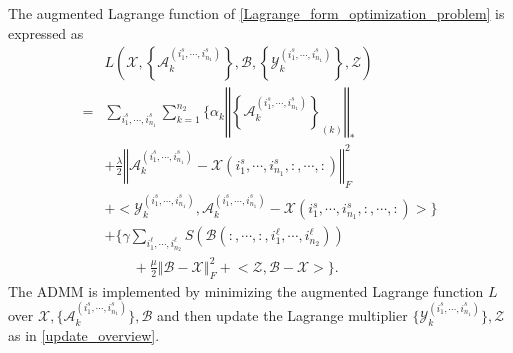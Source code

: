 \documentclass[12pt, draftcls, onecolumn]{IEEEtran}
\theoremstyle{plain}
\theoremstyle{definition}
\theoremstyle{remark}
\newcommand{\nt}[1]{\textcolor{red}{\textbf{[#1]}}}
\begin{document}
The augmented Lagrange function of \eqref{Lagrange_form_optimization_problem} is expressed as
\begin{align}
	\nonumber
   &L\left({\mathcal{X},\left\{\mathcal{A}^{(i^s_{1},\cdots,i^s_{n_1})}_k\right\},\mathcal{B},\left\{\mathcal{Y}^{(i^s_{1},\cdots,i^s_{n_1})}_k\right\},\mathcal{Z}}\right)\\ 
   \nonumber
   = &\sum_{i^s_{1},\cdots,i^s_{n_1}}\sum_{k=1}^{n_2}\Bigg\{\alpha_k\left\Vert \left\{\mathcal{A}^{(i^s_{1},\cdots,i^s_{n_1})}_k\right\}_{(k)}\right\Vert_*\\
   \nonumber
   &+\frac{\lambda}{2}\left\Vert\mathcal{A}^{(i^s_{1},\cdots,i^s_{n_1})}_k-\mathcal{X}(i^s_{1},\cdots,i^s_{n_1},:,\cdots,:)\right\Vert_F^2\\
   \nonumber
   &+\bigg<\mathcal{Y}^{(i^s_{1},\cdots,i^s_{n_1})}_k,\mathcal{A}^{(i^s_{1},\cdots,i^s_{n_1})}_k-\mathcal{X}(i^s_{1},\cdots,i^s_{n_1},:,\cdots,:)\bigg>\Bigg\}\\
   \nonumber
    &+\Bigg\{\gamma \sum_{i^{\ell}_{1},\cdots,i^{\ell}_{n_2}}{S}\left(\mathcal{B}(:,\cdots,:,i^{\ell}_{1},\cdots,i^{\ell}_{n_2})\right)\\
    &\hspace{2em}+\frac{\mu}{2}\left\Vert\mathcal{B}-\mathcal{X}\right\Vert_F^2+\big<\mathcal{Z},\mathcal{B}-\mathcal{X}\big>\Bigg\}.
\end{align}
The ADMM is implemented by minimizing the augmented Lagrange function $L$ over $\mathcal{X},\{\mathcal{A}^{(i^s_{1},\cdots,i^s_{n_1})}_k\},\mathcal{B}$ and then update the Lagrange multiplier $\{\mathcal{Y}^{(i^s_{1},\cdots,i^s_{n_1})}_k\},\mathcal{Z}$ as in \eqref{update_overview}.
\end{document}
